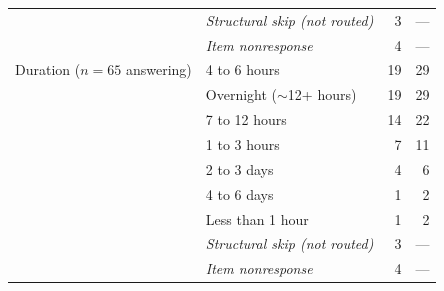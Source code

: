 \documentclass[12pt]{article}
\begin{document}
\begin{table}[htbp]
\begin{tabular}{p{4.2cm}p{5.8cm}rr}
                 & \emph{Structural skip (not routed)} & 3 & --- \\
                 & \emph{Item nonresponse} & 4 & --- \\
\addlinespace
Duration ($n=65$ answering) & 4 to 6 hours & 19 & 29 \\
                 & Overnight ($\sim$12+ hours) & 19 & 29 \\
                 & 7 to 12 hours & 14 & 22 \\
                 & 1 to 3 hours & 7 & 11 \\
                 & 2 to 3 days & 4 & 6 \\
                 & 4 to 6 days & 1 & 2 \\
                 & Less than 1 hour & 1 & 2 \\
                 & \emph{Structural skip (not routed)} & 3 & --- \\
                 & \emph{Item nonresponse} & 4 & --- \\
\bottomrule
\end{tabular}
\end{table}
\end{document}
